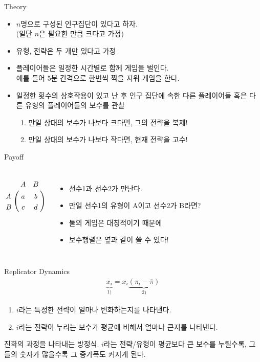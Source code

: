 \documentclass[final]{beamer}
\begin{document}
\begin{frame}[t]{Theory}
	\begin{itemize}
		\item $n$명으로 구성된 인구집단이 있다고 하자. 
		\\ (일단 $n$은 필요한 만큼 크다고 가정)
		\item 유형, 전략은 두 개만 있다고 가정
		\item 플레이어들은 일정한 시간별로 함께 게임을 벌인다. 
		\\ 예를 들어 5분 간격으로 한번씩 짝을 지워 게임을 한다. 
		\item 일정한 횟수의 상호작용이 있고 난 후 인구 집단에 속한 다른 플레이어들 혹은 다른 유형의 플레이어들의 보수를 관찰 
		\begin{enumerate}
		\item 만일 상대의 보수가 나보다 크다면, 그의 전략을 복제!
		\item 만일 상대의 보수가 나보다 작다면, 현재 전략을 고수!
		\end{enumerate}
	\end{itemize}
\end{frame}

\begin{frame}[t]{Payoff}
	\begin{columns}[c]
	\column{10em}
	\begin{align*}
	\bordermatrix{%
	   & A & B \cr
	A & a & b  \cr
	B & c & d  \cr
	}
	\end{align*}
	\column{21em}
	\hspace{-1em}
	\begin{itemize}
		\item 선수1과 선수2가 만난다. 
		\item 만일 선수1의 유형이 A이고 선수2가 B라면?
		\item 둘의 게임은 대칭적이기 때문에 
		\item 보수행렬은 옆과 같이 쓸 수 있다! 
	\end{itemize}
	\end{columns}
\end{frame}

\begin{frame}[t]{Replicator Dynamics}
	\begin{align*}
	\underbrace{\dot{x_i}}_{1)} = x_i \underbrace{(\pi_i - \overline{\pi})}_{2)}
	\end{align*}
	\begin{enumerate}
	\item $i$라는 특정한 전략이 얼마나 변화하는지를 나타낸다. 
	\item $i$라는 전략이 누리는 보수가 평균에 비해서 얼마나 큰지를 나타낸다. 
	\end{enumerate}
	\vspace{2em}
	\begin{mdframed}[backgroundcolor=yellow]\small
	진화의 과정을 나타내는 방정식. $i$라는 전략/유형이 평균보다 큰 보수를 누릴수록, 그들의 숫자가 많을수록 그 증가폭도 커지게 된다. 
	\end{mdframed}	
	
\end{frame}
\end{document}
